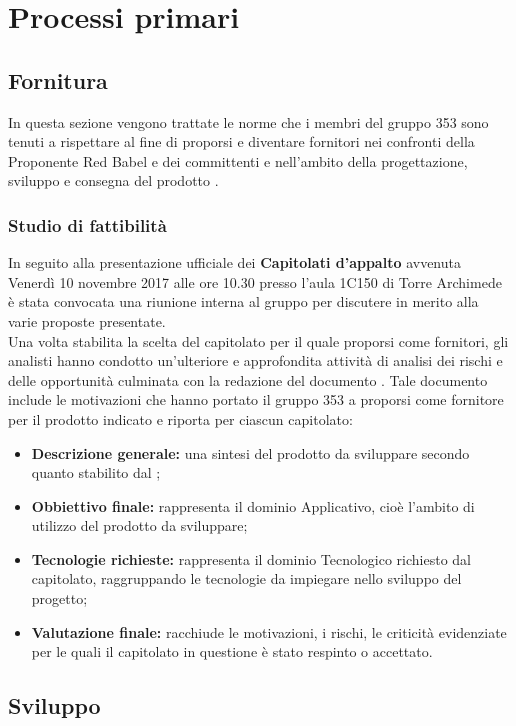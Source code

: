 \documentclass[NormeDiProgetto.tex]{subfiles}
\begin{document}
\chapter{Processi primari}
\section{Fornitura}
In questa sezione vengono trattate le norme che i membri del gruppo 353 sono tenuti a rispettare al fine di proporsi e diventare fornitori nei confronti della Proponente Red Babel e dei committenti \Vardanega{} e \Cardin{} nell'ambito della progettazione, sviluppo e consegna del prodotto \progetto{}.

\subsection{Studio di fattibilità}
In seguito alla presentazione ufficiale dei \textbf{Capitolati d'appalto} avvenuta Venerdì 10 novembre 2017 alle ore 10.30 presso l'aula 1C150 di Torre Archimede è stata convocata una riunione interna al gruppo per discutere in merito alla varie proposte presentate.\\
Una volta stabilita la scelta del capitolato per il quale proporsi come fornitori, gli analisti hanno condotto un'ulteriore e approfondita attività di analisi dei rischi e delle opportunità culminata con la redazione del documento \sdf \vruno. Tale documento include le motivazioni che hanno portato il gruppo 353 a proporsi come fornitore per il prodotto indicato e riporta per ciascun capitolato:
\begin{itemize}
	\item \textbf{Descrizione generale:} una sintesi del prodotto da sviluppare secondo quanto stabilito dal ;
	\item \textbf{Obbiettivo finale:} rappresenta il dominio Applicativo, cioè l'ambito di utilizzo del prodotto da sviluppare;
	\item \textbf{Tecnologie richieste:} rappresenta il dominio Tecnologico richiesto dal capitolato, raggruppando le tecnologie da impiegare nello sviluppo del progetto;
	\item \textbf{Valutazione finale:} racchiude le motivazioni, i rischi, le criticità evidenziate per le quali il capitolato in questione è stato respinto o accettato.
\end{itemize}

\section{Sviluppo}
\end{document}
